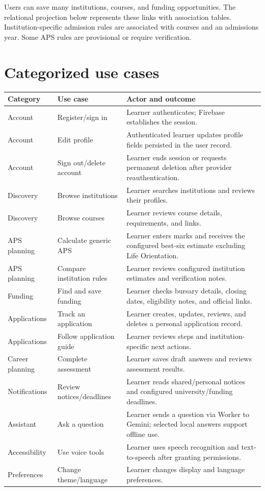\documentclass[11pt,a4paper]{article}
\begin{document}
Users can save many institutions, courses, and funding opportunities. The relational projection below represents these links with association tables. Institution-specific admission rules are associated with courses and an admissions year. Some APS rules are provisional or require verification.

\section{Categorized use cases}
\begin{longtable}{p{}p{}p{}}
\toprule
\textbf{Category} & \textbf{Use case} & \textbf{Actor and outcome}\\
\midrule
Account & Register/sign in & Learner authenticates; Firebase establishes the session.\\
Account & Edit profile & Authenticated learner updates profile fields persisted in the user record.\\
Account & Sign out/delete account & Learner ends session or requests permanent deletion after provider reauthentication.\\
Discovery & Browse institutions & Learner searches institutions and reviews their profiles.\\
Discovery & Browse courses & Learner reviews course details, requirements, and links.\\
APS planning & Calculate generic APS & Learner enters marks and receives the configured best-six estimate excluding Life Orientation.\\
APS planning & Compare institution rules & Learner reviews configured institution estimates and verification notes.\\
Funding & Find and save funding & Learner checks bursary details, closing dates, eligibility notes, and official links.\\
Applications & Track an application & Learner creates, updates, reviews, and deletes a personal application record.\\
Applications & Follow application guide & Learner reviews steps and institution-specific next actions.\\
Career planning & Complete assessment & Learner saves draft answers and reviews assessment results.\\
Notifications & Review notices/deadlines & Learner reads shared/personal notices and configured university/funding deadlines.\\
Assistant & Ask a question & Learner sends a question via Worker to Gemini; selected local answers support offline use.\\
Accessibility & Use voice tools & Learner uses speech recognition and text-to-speech after granting permissions.\\
Preferences & Change theme/language & Learner changes display and language preferences.\\
\bottomrule
\end{longtable}
\end{document}
